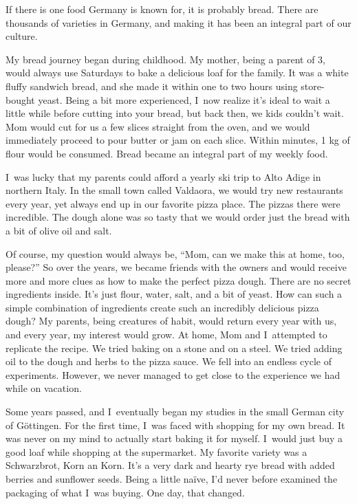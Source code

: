 If there is one food Germany is known for, it is probably bread.
There are thousands of varieties in Germany,
and making it has been an integral part of our culture.

My bread journey began during childhood. My mother, being a parent
of 3, would always use Saturdays to bake a delicious loaf for the family.
It was a white fluffy sandwich bread, and she made it within one to two hours using store-bought yeast.
Being a bit more experienced, I~now realize it's
ideal to wait a little while before cutting into your bread, but back then,
we kids couldn't wait. Mom would cut for us a few slices straight from the oven, and we would
immediately proceed to pour butter or jam on each slice. Within minutes, 1 kg of
flour would be consumed. Bread became an integral part of my weekly food.

I~was lucky that my parents could afford a yearly ski trip to
Alto Adige in northern Italy. In the small town called Valdaora, we
would try new restaurants every year, yet always end up in our favorite
pizza place. The pizzas there were incredible. The dough
alone was so tasty that we would order just the bread with a
bit of olive oil and salt.

Of course, my question would always be, ``Mom, can we make this at home, too, please?''
So over the years, we became friends with the owners and would receive
more and more clues as how to make the perfect pizza dough. There
are no secret ingredients inside. It's just flour, water, salt, and a bit of yeast.
How can such a simple combination of ingredients create such an incredibly delicious
pizza dough? My parents, being creatures of habit, would return every year with us,
and every year, my interest would grow. At home, Mom and I~attempted to replicate
the recipe. We tried baking on a stone and on a steel. We tried adding oil to the dough and herbs
to the pizza sauce. We fell into an endless cycle of experiments. However, we never managed
to get close to the experience we had while on vacation.

Some years passed, and I~eventually began my studies in the small German city of Göttingen.
For the first time, I~was faced with shopping for my own bread. It was never
on my mind to actually start baking it for myself. I~would just buy 
a good loaf while shopping at the supermarket. My favorite variety
was a Schwarzbrot, Korn an Korn. It’s a very dark and hearty rye bread
with added berries and sunflower seeds. Being a little naïve,
I'd never before examined the packaging of what I~was buying. One day, that
changed.

